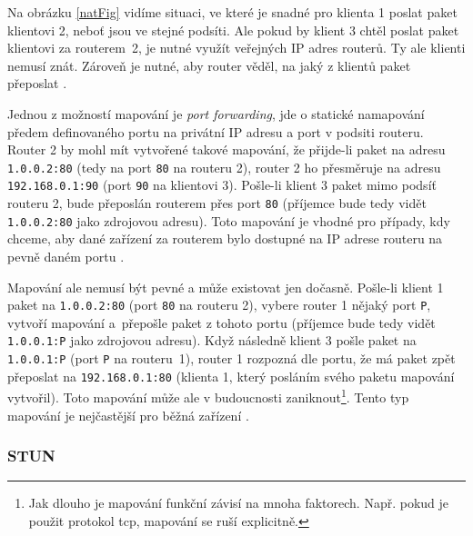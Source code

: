 Na obrázku \ref{natFig} vidíme situaci, ve které je snadné pro klienta 1 poslat
paket klientovi 2, neboť jsou ve stejné podsíti. Ale pokud by klient 3 chtěl
poslat paket klientovi za routerem~2, je nutné využít veřejných IP adres
routerů. Ty ale klienti nemusí znát. Zároveň je nutné, aby router věděl, na jaký
z klientů paket přeposlat \parencite{WebRTCForTheCurious}.

Jednou z možností mapování je \textit{port forwarding}, jde o statické
namapování předem definovaného portu na privátní IP adresu a port v podsiti
routeru. Router 2 by mohl mít vytvořené takové mapování, že přijde-li paket na
adresu \texttt{1.0.0.2:80} (tedy na port \texttt{80} na
routeru 2), router 2 ho přesměruje na adresu \texttt{192.168.0.1:90}
(port \texttt{90} na klientovi 3). Pošle-li klient 3 paket mimo podsíť
routeru 2, bude přeposlán routerem přes port \texttt{80} (příjemce
bude tedy vidět \texttt{1.0.0.2:80} jako zdrojovou adresu). Toto
mapování je vhodné pro případy, kdy chceme, aby dané zařízení za routerem bylo
dostupné na IP adrese routeru na pevně daném portu
\parencite{G2-WhatIsPortForwarding}.

Mapování ale nemusí být pevné a může existovat jen dočasně. Pošle-li klient 1
paket na \texttt{1.0.0.2:80} (port \texttt{80} na routeru
2), vybere router 1 nějaký port \texttt{P}, vytvoří mapování
a~přepošle paket z tohoto portu (příjemce bude tedy vidět
\texttt{1.0.0.1:P} jako zdrojovou adresu). Když následně klient 3
pošle paket na \texttt{1.0.0.1:P} (port \texttt{P} na
routeru~1), router 1 rozpozná dle portu, že má paket zpět přeposlat na
\texttt{192.168.0.1:80} (klienta 1, který posláním svého paketu
mapování vytvořil). Toto mapování může ale v budoucnosti zaniknout\footnote{Jak
    dlouho je mapování funkční závisí na mnoha faktorech. Např. pokud je použit
    protokol \gls{tcp}, mapování se ruší explicitně.}. Tento typ mapování je
nejčastější pro běžná zařízení \parencite{WebRTCForTheCurious}.

\subsubsection{STUN}\label{stun}

